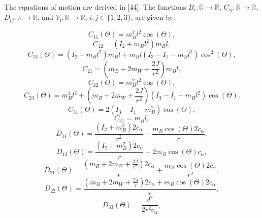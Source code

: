 	
	The equations of motion are derived in [44]. The functions $B_i: \mathbb{R} \rightarrow \mathbb{R}$, $C_{ij}: \mathbb{R} \rightarrow \mathbb{R}$, $D_{ij}: \mathbb{R} \rightarrow \mathbb{R}$, and $V_i: \mathbb{R} \rightarrow \mathbb{R}$, $i,j \in \{1,2,3\}$, are given by:
	
\begin{equation}
C_{11}(\Theta) = m_B^2 l^2 \cos(\Theta),
\end{equation}
\begin{equation}
C_{12} = (I_2 + m_B l^2) m_B l,
\end{equation}
\begin{equation}
C_{13}(\Theta) = (I_2 + m_B l^2) m_B l + m_B l (I_3 - I_1 - m_B l^2) \cos^2(\Theta),
\end{equation}
\begin{equation}
C_{21} = (m_B + 2m_W + \frac{2J}{r^2}) m_B l,
\end{equation}
\begin{equation}
C_{22}(\Theta) = m_B^2 l^2 \cos(\Theta),
\end{equation}
\begin{equation}
C_{23}(\Theta) = m_B^2 l^2 + (m_B + 2m_W + \frac{2J}{r^2}) (I_3 - I_1 - m_B l^2) \cos(\Theta).
\end{equation}
\begin{equation}
	C_{31}(\Theta) = 2 (I_3 - I_1 - m_B^2) \cos(\Theta),
\end{equation}
\begin{equation}
	C_{31} = m_B l,
\end{equation}
\begin{equation}
	D_{11}(\Theta) = \frac{(I_2 + m_B^2) 2c_\alpha}{r^2} - \frac{m_B \cos(\Theta) 2c_\alpha}{r},
\end{equation}
\begin{equation}
	D_{12}(\Theta) = \frac{(I_2 + m_B^2) 2c_\alpha}{r} - 2m_B \cos(\Theta) c_\alpha,
\end{equation}
\begin{equation}
	D_{21}(\Theta) = \frac{(m_B + 2m_W + \frac{2J}{r^2}) 2c_\alpha}{r} + \frac{m_B \cos(\Theta) 2c_\alpha}{r^2},
\end{equation}
\begin{equation}
	D_{22}(\Theta) = \frac{(m_B + 2m_W + \frac{2J}{r}) 2c_\alpha + m_B \cos(\Theta) 2c_\alpha}{r},
\end{equation}
\begin{equation}
	D_{33}(\Theta) = \frac{d^2}{2r^2 c_\alpha},
\end{equation}
